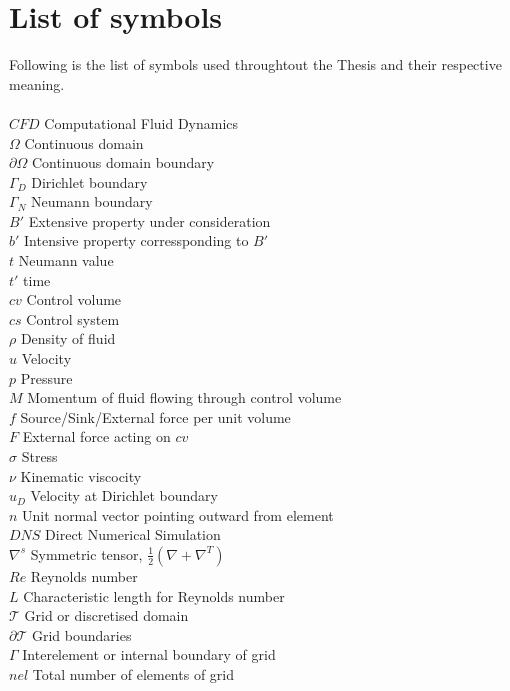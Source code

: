 \documentclass[a4paper,12pt]{book}
\begin{document}
\section{List of symbols} \label{symbol_list}

Following is the list of symbols used throughtout the Thesis and their respective meaning.\\
${}$\\
$CFD$ Computational Fluid Dynamics\\
$\Omega$ Continuous domain\\
$\partial \Omega$ Continuous domain boundary\\
$\Gamma_D$ Dirichlet boundary\\
$\Gamma_N$ Neumann boundary\\
$B'$ Extensive property under consideration \\
$b'$ Intensive property corressponding to $B'$\\
$t$ Neumann value\\
$t'$ time\\
$cv$ Control volume\\
$cs$ Control system\\
$\rho$ Density of fluid \\
$u$ Velocity\\
$p$ Pressure\\
$M$ Momentum of fluid flowing through control volume\\
$f$ Source/Sink/External force per unit volume\\
$F$ External force acting on $cv$\\
$\sigma$ Stress\\
$\nu$ Kinematic viscocity\\
$u_D$ Velocity at Dirichlet boundary\\
$n$ Unit normal vector pointing outward from element\\
$DNS$ Direct Numerical Simulation\\
$\nabla^s$ Symmetric tensor, $\frac{1}{2} (\nabla + \nabla^T)$\\
$Re$ Reynolds number\\
$L$ Characteristic length for Reynolds number\\
$\mathcal{T}$ Grid or discretised domain\\
$\partial \mathcal{T}$ Grid boundaries\\
$\Gamma$ Interelement or internal boundary of grid\\
$nel$ Total number of elements of grid\\
\end{document}
